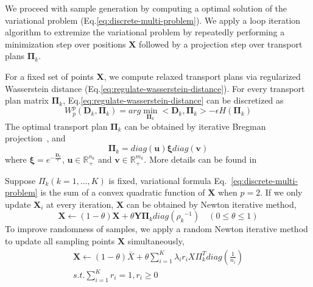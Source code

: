  We proceed with sample generation by computing a optimal solution of the variational problem (Eq.\ref{eq:discrete-multi-problem}).
 We apply a loop iteration algorithm to extremize the variational problem by repeatedly performing a minimization step over positions $\mathbf{X}$ followed by a projection step over transport plans $\mathbf{\Pi}_k$.

 For a fixed set of points $\mathbf X$,
 we compute  relaxed transport plans via regularized Wasserstein distance (Eq.\ref{eq:regulate-wasserstein-distance}).
 For every transport plan matrix $\mathbf{\Pi}_k$,
 Eq.\ref{eq:regulate-wasserstein-distance} can be discretized as
 \begin{equation}\label{eq:discrete-regulate-wasserstein-barycenter}
   W_p^p(\mathbf{D}_k,\mathbf{\Pi}_k)=arg\min\limits_{\mathbf{\Pi}_k}<\mathbf{D}_k,\mathbf{\Pi}_k>-\epsilon H(\mathbf{\Pi}_k)
 \end{equation}
The optimal transport plan $\mathbf{\Pi}_k$ can be obtained by iterative Bregman projection~\cite{cuturi:2013:sinkhorn,benamou:2015:iterative}, and
\begin{equation}\label{eq:transport-plan}
  \mathbf{\Pi}_k=diag(\mathbf{u})\mathbf{\xi}diag(\mathbf{v})
\end{equation}
where $\mathbf{\xi}=e^{-\frac{\mathbf{D}_k}{\epsilon}}$,
$\mathbf{u}\in \mathbb{R}_+^{n_k}$ and $\mathbf{v}\in\mathbb{R}_+^{m_k}$.
More details can be found in~\cite{cuturi:2013:sinkhorn,cuturi:2013:fast,benamou:2015:iterative}



Suppose $\Pi_k(k=1,...,K)$ is fixed,
variational formula Eq.~\ref{eq:discrete-multi-problem}
is the sum of a convex quadratic function of $\mathbf{X}$ when $p=2$.
If we only update $\mathbf{X}_i$ at every iteration,
$\mathbf{X}$ can be obtained by Newton iterative method,
\begin{equation}\label{eq:position-iterative}
  \mathbf{X}\leftarrow(1-\theta)\mathbf{X}+\theta\mathbf{Y}\mathbf{\Pi}_kdiag({\rho_k}^{-1}) \quad (0\leq\theta\leq 1)
\end{equation}
To improve randomness of samples,
we apply a random Newton iterative method to update all sampling points $\mathbf{X}$ simultaneously,
\begin{equation}
\begin{split}
\mathbf{X}\leftarrow(1-\theta)\bar X+\theta\sum_{i=1}^K\lambda_ir_iX\Pi_k^Tdiag(\frac{1}{n_i})\\
 s.t. \sum\limits_{i=1}^{K}r_i=1, r_i\geq 0
 \end{split}
\end{equation}

